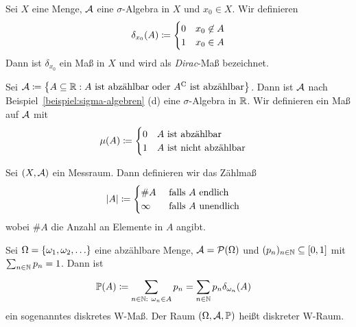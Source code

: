 \begin{beispiel}
    Sei $X$ eine Menge, $\mathcal{A}$ eine $\sigma$-Algebra in $X$ und $x_0\in X$. Wir definieren
    \begin{align*}
        \delta_{x_0}\of{A} \coloneqq \begin{cases}
                                         0 &x_0\not\in A\\
                                         1 &x_0\in A
        \end{cases}
    \end{align*}
    Dann ist $\delta_{x_0}$ ein Maß in $X$ und wird als \textit{Dirac}-Maß bezeichnet.
\end{beispiel}

\begin{beispiel}
    Sei $\mathcal{A}\coloneqq\left\{A\subseteq\mathbb{R}: A\text{ ist abzählbar oder }{A}^{\mathrm{C}}\text{ ist abzählbar}\right\}$. Dann ist $\mathcal{A}$ nach Beispiel~\ref{beispiel:sigma-algebren} (d) eine $\sigma$-Algebra in $\mathbb{R}$. Wir definieren ein Maß auf $\mathcal{A}$ mit
    \begin{align*}
        \mu\of{A} &\coloneqq \begin{cases}
                                 0 &A\text{ ist abzählbar}\\
                                 1 &A\text{ ist nicht abzählbar}
        \end{cases}
    \end{align*}
\end{beispiel}

\begin{beispiel}[Zählmaß]
    Sei $\left(X, \mathcal{A}\right)$ ein Messraum. Dann definieren wir das Zählmaß
    \begin{align*}
        \left\lvert A\right\rvert &\coloneqq \begin{cases}
                               \#A &\text{ falls $A$ endlich}\\
                               \infty &\text{ falls $A$ unendlich}
        \end{cases}
    \end{align*}
    wobei $\#A$ die Anzahl an Elemente in $A$ angibt.
\end{beispiel}

\begin{beispiel}
    Sei $\Omega = \left\{\omega_1, \omega_2, \ldots\right\}$ eine abzählbare Menge, $\mA = \mathcal{P}\of{\Omega}$ und $(p_n)_{n\in\mathbb{N}} \subseteq\left[0,1\right]$ mit $ \sum_{n\in\mathbb{N}}^{} p_n = 1$. Dann ist
    \begin{align*}
        \mathbb{P}\of{A} &\coloneqq \sum_{n\in\N:~\omega_n\in A}^{} p_n = \sum_{n\in\N}^{} p_n\delta_{\omega_n}\of{A}
    \end{align*}
    ein sogenanntes diskretes W-Maß. Der Raum $\left(\Omega, \mathcal{A}, \mathbb{P}\right)$ heißt diskreter W-Raum.
\end{beispiel}

